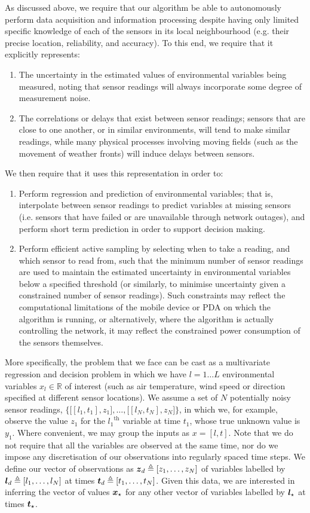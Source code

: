 \documentclass{acmtrans2m}
\begin{document}
\noindent As discussed above, we require that our algorithm be able to autonomously perform data acquisition and information processing despite having only limited specific knowledge of each of the sensors in its local neighbourhood (e.g. their precise location, reliability, and accuracy). To this end, we require that it explicitly represents:
\begin{enumerate}
\item The uncertainty in the estimated values of environmental variables being measured, noting that sensor readings will always incorporate some degree of measurement noise.
\item The correlations or delays that exist between sensor readings; sensors that are close to one another, or in similar environments, will tend to make similar readings, while many physical processes involving moving fields (such as the movement of weather fronts) will induce delays between sensors.
\end{enumerate}
We then require that it uses this representation in order to:
\begin{enumerate}
\item Perform regression and prediction of environmental variables; that is, interpolate between sensor readings to predict variables at missing sensors (i.e. sensors that have failed or are unavailable through network outages), and perform short term prediction in order to support decision making.
\item Perform efficient active sampling by selecting when to take a reading, and which sensor to read from, such that the minimum number of sensor readings are used to maintain the estimated uncertainty in environmental variables below a specified threshold (or similarly, to minimise uncertainty given a constrained number of sensor readings). Such constraints may reflect the computational limitations of the mobile device or PDA on which the algorithm is running, or alternatively, where the algorithm is actually controlling the network, it may reflect the constrained power consumption of the sensors themselves.
\end{enumerate}
More specifically, the problem that we face can be cast as a multivariate regression and decision problem in which we have $l=1\ldots L$ environmental variables $x_l \in \mathbb{R}$ of interest (such as air temperature, wind speed or direction specified at different sensor locations). We assume a set of $N$ potentially noisy sensor readings, $ \bigl\{\bigl[[l_1,t_1],z_1\bigr],\ldots,\bigl[[l_N,t_N],z_N\bigr]\bigr\}$, in which we, for example, observe the value $z_1$ for the ${l_1}^\text{th}$ variable at time $t_1$, whose true unknown value is $y_1$. Where convenient, we may group the inputs as $x=[l,t]$. Note that we do not require that all the variables are observed at the same time, nor do we impose any discretisation of our observations into regularly spaced time steps. We define our vector of observations as $\boldsymbol{z}_d\triangleq[z_1,\ldots,z_N]$ of variables labelled by $\boldsymbol{l}_d\triangleq[l_1,\ldots,l_N]$ at times $\boldsymbol{t}_d\triangleq[t_1,\ldots,t_N]$. Given this data, we are interested in inferring the vector of values $\boldsymbol{x}_\star$ for any other vector of variables labelled by $\boldsymbol{l}_\star$ at times $\boldsymbol{t}_\star$.
\end{document}
